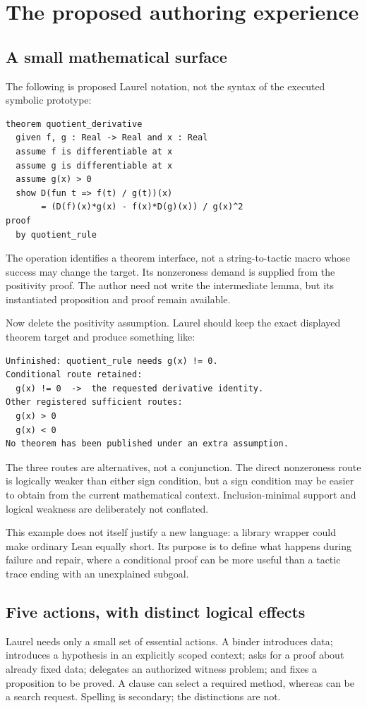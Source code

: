 \documentclass[11pt,a4paper]{article}
\newcommand{\code}[1]{\texttt{\detokenize{#1}}}
\theoremstyle{definition}
\theoremstyle{remark}
\begin{document}
\section{The proposed authoring experience}
\subsection{A small mathematical surface}
The following is proposed Laurel notation, not the syntax of the executed symbolic prototype:
\begin{lstlisting}
theorem quotient_derivative
  given f, g : Real -> Real and x : Real
  assume f is differentiable at x
  assume g is differentiable at x
  assume g(x) > 0
  show D(fun t => f(t) / g(t))(x)
       = (D(f)(x)*g(x) - f(x)*D(g)(x)) / g(x)^2
proof
  by quotient_rule
\end{lstlisting}
The operation identifies a theorem interface, not a string-to-tactic macro whose success may change the target. Its nonzeroness demand is supplied from the positivity proof. The author need not write the intermediate lemma, but its instantiated proposition and proof remain available.

Now delete the positivity assumption. Laurel should keep the exact displayed theorem target and produce something like:
\begin{lstlisting}
Unfinished: quotient_rule needs g(x) != 0.
Conditional route retained:
  g(x) != 0  ->  the requested derivative identity.
Other registered sufficient routes:
  g(x) > 0
  g(x) < 0
No theorem has been published under an extra assumption.
\end{lstlisting}
The three routes are alternatives, not a conjunction. The direct nonzeroness route is logically weaker than either sign condition, but a sign condition may be easier to obtain from the current mathematical context. Inclusion-minimal support and logical weakness are deliberately not conflated.

This example does not itself justify a new language: a library wrapper could make ordinary Lean equally short. Its purpose is to define what happens during failure and repair, where a conditional proof can be more useful than a tactic trace ending with an unexplained subgoal.

\subsection{Five actions, with distinct logical effects}
Laurel needs only a small set of essential actions. A \code{given} binder introduces data; \code{assume} introduces a hypothesis in an explicitly scoped context; \code{establish} asks for a proof about already fixed data; \code{construct} delegates an authorized witness problem; and \code{show} fixes a proposition to be proved. A \code{by} clause can select a required method, whereas \code{by?} can be a search request. Spelling is secondary; the distinctions are not.
\end{document}
